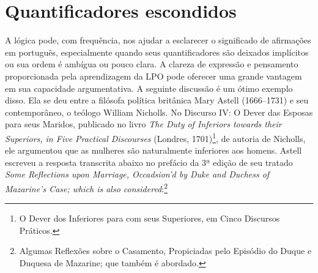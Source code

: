 \section{Quantificadores escondidos}
\label{ss:SuppQuant}
A lógica pode, com frequência, nos ajudar a esclarecer o significado de afirmações em português, especialmente quando seus quantificadores são deixados implícitos ou sua ordem é ambígua ou pouco clara.
A clareza de expressão e pensamento proporcionada pela aprendizagem da LPO pode oferecer uma grande vantagem em sua capacidade argumentativa.
A seguinte discussão é um ótimo exemplo disso.
Ela se deu entre a filósofa política britânica Mary Astell (1666--1731) e seu contemporâneo, o teólogo William Nicholls.
No Discurso IV: O Dever das Esposas para seus Maridos, publicado no livro \emph{The Duty of Inferiors towards their Superiors, in Five Practical Discourses} (Londres, 1701)\footnote{
	O Dever dos Inferiores para com seus Superiores, em Cinco Discursos Práticos.},
de autoria de Nicholls, ele argumentou que as mulheres são naturalmente inferiores aos homens.
Astell escreveu a resposta transcrita abaixo no prefácio da 3ª edição de seu tratado \emph{Some Reflections upon Marriage, Occadsion'd by Duke and Duchess of Mazarine's Case; which is also considered}:\footnote{
	Algumas Reflexões sobre o Casamento, Propiciadas pelo Episódio do Duque e Duquesa de Mazarine; que também é abordado.}
